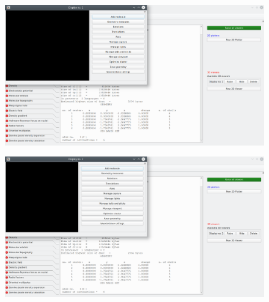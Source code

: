 \documentclass[a4paper,10pt]{article}
\begin{document}
\begin{minipage}{.5\linewidth}
\begin{figure}[H]
\caption{\label{fig:37}}
\begin{center}
\includegraphics[width=0.95\linewidth]{damqt_QS_fig37.png}
\end{center}
\end{figure} 
\end{minipage}
\begin{minipage}{.5\linewidth}
\begin{figure}[H]
\caption{\label{fig:38}}
\begin{center}
\includegraphics[width=0.95\linewidth]{damqt_QS_fig38.png}
\end{center}
\end{figure} 
\end{minipage}
\end{document}
